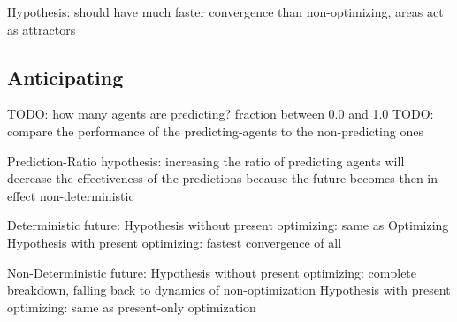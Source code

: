 Hypothesis: should have much faster convergence than non-optimizing, areas act as attractors

\subsection{Anticipating}
TODO: how many agents are predicting? fraction between 0.0 and 1.0
TODO: compare the performance of the predicting-agents to the non-predicting ones

Prediction-Ratio
	hypothesis: increasing the ratio of predicting agents will decrease the effectiveness of the predictions because the future becomes then in effect non-deterministic

Deterministic future:
	Hypothesis without present optimizing:  	same as Optimizing
	Hypothesis with present optimizing: 		fastest convergence of all
		
Non-Deterministic future:
	Hypothesis without present optimizing: 		complete breakdown, falling back to dynamics of non-optimization
	Hypothesis with present optimizing: 		same as present-only optimization